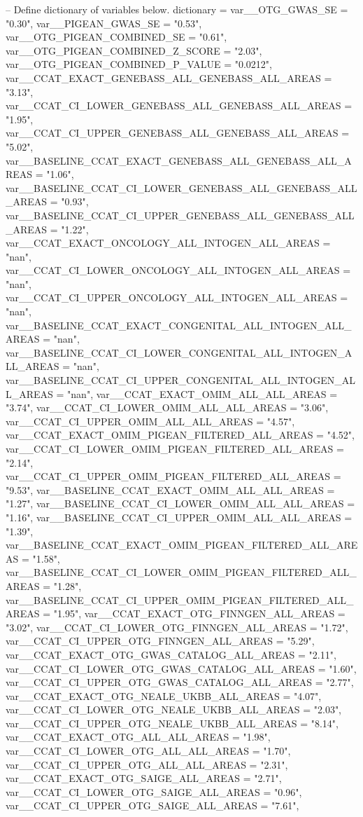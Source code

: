 
\begin{luacode*}
    -- Define dictionary of variables below.
        dictionary = {
		var__OTG_GWAS_SE = "0.30",
		var__PIGEAN_GWAS_SE = "0.53",
		var__OTG_PIGEAN_COMBINED_SE = "0.61",
		var__OTG_PIGEAN_COMBINED_Z_SCORE = "2.03",
		var__OTG_PIGEAN_COMBINED_P_VALUE = "0.0212",
		var__CCAT_EXACT_GENEBASS_ALL_GENEBASS_ALL_AREAS = "3.13",
		var__CCAT_CI_LOWER_GENEBASS_ALL_GENEBASS_ALL_AREAS = "1.95",
		var__CCAT_CI_UPPER_GENEBASS_ALL_GENEBASS_ALL_AREAS = "5.02",
		var__BASELINE_CCAT_EXACT_GENEBASS_ALL_GENEBASS_ALL_AREAS = "1.06",
		var__BASELINE_CCAT_CI_LOWER_GENEBASS_ALL_GENEBASS_ALL_AREAS = "0.93",
		var__BASELINE_CCAT_CI_UPPER_GENEBASS_ALL_GENEBASS_ALL_AREAS = "1.22",
		var__CCAT_EXACT_ONCOLOGY_ALL_INTOGEN_ALL_AREAS = "nan",
		var__CCAT_CI_LOWER_ONCOLOGY_ALL_INTOGEN_ALL_AREAS = "nan",
		var__CCAT_CI_UPPER_ONCOLOGY_ALL_INTOGEN_ALL_AREAS = "nan",
		var__BASELINE_CCAT_EXACT_CONGENITAL_ALL_INTOGEN_ALL_AREAS = "nan",
		var__BASELINE_CCAT_CI_LOWER_CONGENITAL_ALL_INTOGEN_ALL_AREAS = "nan",
		var__BASELINE_CCAT_CI_UPPER_CONGENITAL_ALL_INTOGEN_ALL_AREAS = "nan",
		var__CCAT_EXACT_OMIM_ALL_ALL_AREAS = "3.74",
		var__CCAT_CI_LOWER_OMIM_ALL_ALL_AREAS = "3.06",
		var__CCAT_CI_UPPER_OMIM_ALL_ALL_AREAS = "4.57",
		var__CCAT_EXACT_OMIM_PIGEAN_FILTERED_ALL_AREAS = "4.52",
		var__CCAT_CI_LOWER_OMIM_PIGEAN_FILTERED_ALL_AREAS = "2.14",
		var__CCAT_CI_UPPER_OMIM_PIGEAN_FILTERED_ALL_AREAS = "9.53",
		var__BASELINE_CCAT_EXACT_OMIM_ALL_ALL_AREAS = "1.27",
		var__BASELINE_CCAT_CI_LOWER_OMIM_ALL_ALL_AREAS = "1.16",
		var__BASELINE_CCAT_CI_UPPER_OMIM_ALL_ALL_AREAS = "1.39",
		var__BASELINE_CCAT_EXACT_OMIM_PIGEAN_FILTERED_ALL_AREAS = "1.58",
		var__BASELINE_CCAT_CI_LOWER_OMIM_PIGEAN_FILTERED_ALL_AREAS = "1.28",
		var__BASELINE_CCAT_CI_UPPER_OMIM_PIGEAN_FILTERED_ALL_AREAS = "1.95",
		var__CCAT_EXACT_OTG_FINNGEN_ALL_AREAS = "3.02",
		var__CCAT_CI_LOWER_OTG_FINNGEN_ALL_AREAS = "1.72",
		var__CCAT_CI_UPPER_OTG_FINNGEN_ALL_AREAS = "5.29",
		var__CCAT_EXACT_OTG_GWAS_CATALOG_ALL_AREAS = "2.11",
		var__CCAT_CI_LOWER_OTG_GWAS_CATALOG_ALL_AREAS = "1.60",
		var__CCAT_CI_UPPER_OTG_GWAS_CATALOG_ALL_AREAS = "2.77",
		var__CCAT_EXACT_OTG_NEALE_UKBB_ALL_AREAS = "4.07",
		var__CCAT_CI_LOWER_OTG_NEALE_UKBB_ALL_AREAS = "2.03",
		var__CCAT_CI_UPPER_OTG_NEALE_UKBB_ALL_AREAS = "8.14",
		var__CCAT_EXACT_OTG_ALL_ALL_AREAS = "1.98",
		var__CCAT_CI_LOWER_OTG_ALL_ALL_AREAS = "1.70",
		var__CCAT_CI_UPPER_OTG_ALL_ALL_AREAS = "2.31",
		var__CCAT_EXACT_OTG_SAIGE_ALL_AREAS = "2.71",
		var__CCAT_CI_LOWER_OTG_SAIGE_ALL_AREAS = "0.96",
		var__CCAT_CI_UPPER_OTG_SAIGE_ALL_AREAS = "7.61",
}
\end{luacode*}
